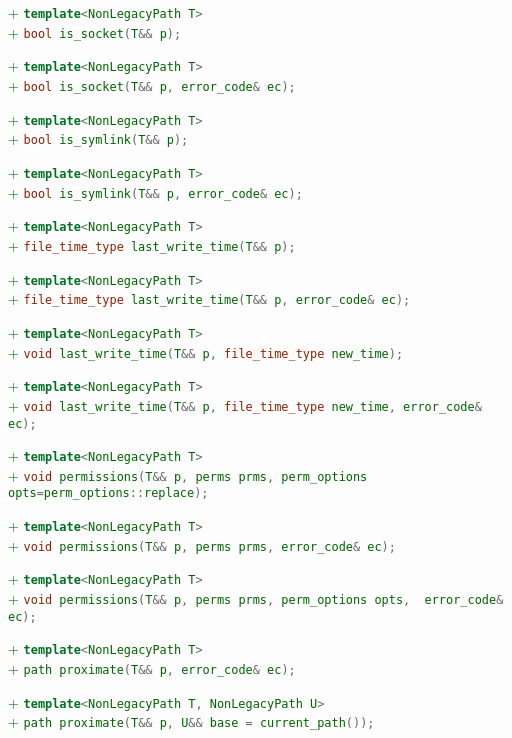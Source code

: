 \documentclass[11pt]{article}
\newcommand{\code}[2][cpp]{\lstinline[language=#1,basicstyle=\small\ttfamily]{#2}}
\newcommand{\tsreplace}[3]{\textcolor{red}{\sout{#1}}#2\textcolor{darkgreen}{#3}}
\begin{document}
\tsreplace{}{}{+ \code{template<NonLegacyPath T>}}\\
\tsreplace{}{}{+ \code{bool is_socket(T&& p);}}

\tsreplace{}{}{+ \code{template<NonLegacyPath T>}}\\
\tsreplace{}{}{+ \code{bool is_socket(T&& p, error_code& ec);}}

\tsreplace{}{}{+ \code{template<NonLegacyPath T>}}\\
\tsreplace{}{}{+ \code{bool is_symlink(T&& p);}}

\tsreplace{}{}{+ \code{template<NonLegacyPath T>}}\\
\tsreplace{}{}{+ \code{bool is_symlink(T&& p, error_code& ec);}}

\tsreplace{}{}{+ \code{template<NonLegacyPath T>}}\\
\tsreplace{}{}{+ \code{file_time_type last_write_time(T&& p);}}

\tsreplace{}{}{+ \code{template<NonLegacyPath T>}}\\
\tsreplace{}{}{+ \code{file_time_type last_write_time(T&& p, error_code& ec);}}

\tsreplace{}{}{+ \code{template<NonLegacyPath T>}}\\
\tsreplace{}{}{+ \code{void last_write_time(T&& p, file_time_type new_time);}}

\tsreplace{}{}{+ \code{template<NonLegacyPath T>}}\\
\tsreplace{}{}{+ \code{void last_write_time(T&& p, file_time_type new_time, error_code& ec);}}

\tsreplace{}{}{+ \code{template<NonLegacyPath T>}}\\
\tsreplace{}{}{+ \code{void permissions(T&& p, perms prms, perm_options opts=perm_options::replace);}}

\tsreplace{}{}{+ \code{template<NonLegacyPath T>}}\\
\tsreplace{}{}{+ \code{void permissions(T&& p, perms prms, error_code& ec);}}

\tsreplace{}{}{+ \code{template<NonLegacyPath T>}}\\
\tsreplace{}{}{+ \code{void permissions(T&& p, perms prms, perm_options opts,  error_code& ec);}}

\tsreplace{}{}{+ \code{template<NonLegacyPath T>}}\\
\tsreplace{}{}{+ \code{path proximate(T&& p, error_code& ec);}}

\tsreplace{}{}{+ \code{template<NonLegacyPath T, NonLegacyPath U>}}\\
\tsreplace{}{}{+ \code{path proximate(T&& p, U&& base = current_path());}}
\end{document}
